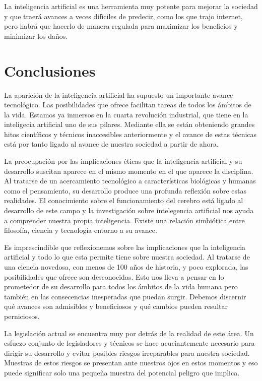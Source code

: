 \documentclass[12pt,a4paper]{article}
\begin{document}
La inteligencia artificial es una herramienta muy potente para mejorar la sociedad y que traerá avances a veces difíciles de predecir, como los que trajo internet, pero habrá que hacerlo de manera regulada para maximizar los beneficios y minimizar los daños.

\section{Conclusiones}

La aparición de la inteligencia artificial ha supuesto un importante avance tecnológico. Las posibilidades que ofrece facilitan tareas de todos los ámbitos de la vida. Estamos ya inmersos en la cuarta revolución industrial, que tiene en la inteligecia artificial uno de sus pilares. Mediante ella se están obteniendo grandes hitos científicos y técnicos inaccesibles anteriormente y el avance de estas técnicas está por tanto ligado al avance de nuestra sociedad a partir de ahora.

La preocupación por las implicaciones éticas que la inteligencia artificial y su desarrollo suscitan aparece en el mismo momento en el que aparece la disciplina. Al tratarse de un acercamiento tecnológico a características biológicas y humanas como el pensamiento, su desarrollo produce una profunda reflexión sobre estas realidades. El conocimiento sobre el funcionamiento del cerebro está ligado al desarrollo de este campo y la investigación sobre intelegencia artificial nos ayuda a comprender nuestra propia inteligencia. Existe una relación simbiótica entre filosofía, ciencia y tecnología entorno a su avance.

Es imprescindible que reflexionemos sobre las implicaciones que la inteligencia artificial y todo lo que esta permite tiene sobre nuestra sociedad. Al tratarse de una ciencia novedosa, con menos de 100 años de historia, y poco explorada, las posibilidades que ofrece son desconocidas. Esto nos lleva a pensar en lo prometedor de su desarrollo para todos los ámbitos de la vida humana pero también en las consecencias inesperadas que puedan surgir. Debemos discernir qué avances son admisibles y beneficiosos y qué cambios pueden resultar perniciosos.

La legislación actual se encuentra muy por detrás de la realidad de este área. Un esfuezo conjunto de legisladores y técnicos se hace acuciantemente necesario para dirigir su desarrollo y evitar posibles riesgos irreparables para nuestra sociedad. Muestras de estos riesgos se presentan ante nuestros ojos en estos momentos y eso puede significar solo una pequeña muestra del potencial peligro que implica.
\end{document}
